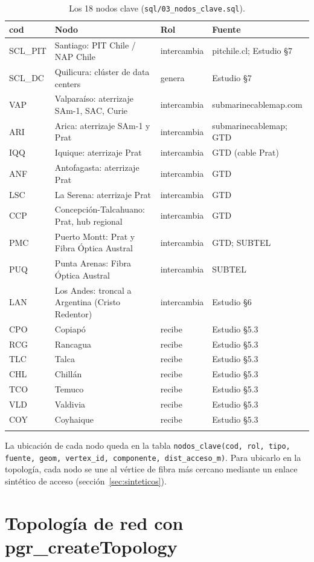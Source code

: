 \documentclass[11pt,a4paper]{article}
\newcommand{\cod}[1]{\texttt{#1}}
\begin{document}
\begin{longtable}{>{\ttfamily}l p{6.2cm} l l}
\toprule
cod & Nodo & Rol & Fuente \\
\midrule
\endhead
SCL\_PIT & Santiago: PIT Chile / NAP Chile & intercambia & pitchile.cl; Estudio §7 \\
SCL\_DC & Quilicura: clúster de data centers & genera & Estudio §7 \\
VAP & Valparaíso: aterrizaje SAm-1, SAC, Curie & intercambia & submarinecablemap.com \\
ARI & Arica: aterrizaje SAm-1 y Prat & intercambia & submarinecablemap; GTD \\
IQQ & Iquique: aterrizaje Prat & intercambia & GTD (cable Prat) \\
ANF & Antofagasta: aterrizaje Prat & intercambia & GTD \\
LSC & La Serena: aterrizaje Prat & intercambia & GTD \\
CCP & Concepción-Talcahuano: Prat, hub regional & intercambia & GTD \\
PMC & Puerto Montt: Prat y Fibra Óptica Austral & intercambia & GTD; SUBTEL \\
PUQ & Punta Arenas: Fibra Óptica Austral & intercambia & SUBTEL \\
LAN & Los Andes: troncal a Argentina (Cristo Redentor) & intercambia & Estudio §6 \\
CPO & Copiapó & recibe & Estudio §5.3 \\
RCG & Rancagua & recibe & Estudio §5.3 \\
TLC & Talca & recibe & Estudio §5.3 \\
CHL & Chillán & recibe & Estudio §5.3 \\
TCO & Temuco & recibe & Estudio §5.3 \\
VLD & Valdivia & recibe & Estudio §5.3 \\
COY & Coyhaique & recibe & Estudio §5.3 \\
\bottomrule
\caption{Los 18 nodos clave (\cod{sql/03\_nodos\_clave.sql}).}
\end{longtable}

La ubicación de cada nodo queda en la tabla \cod{nodos\_clave(cod, rol, tipo, fuente, geom,
vertex\_id, componente, dist\_acceso\_m)}. Para ubicarlo en la topología, cada nodo se une al
vértice de fibra más cercano mediante un enlace sintético de acceso (sección~\ref{sec:sinteticos}).

\section{Topología de red con pgr\_createTopology}
\end{document}
